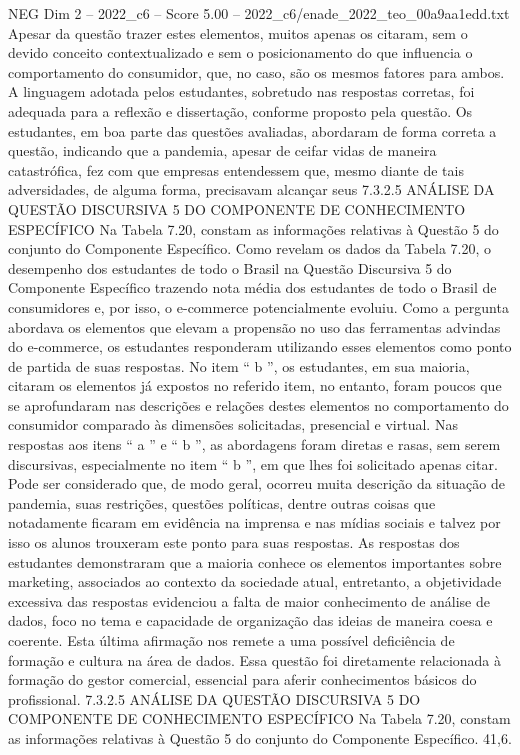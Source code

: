 \begin{textsample}{NEG Dim 2 – 2022\_c6 – Score 5.00 – 2022\_c6/enade\_2022\_teo\_00a9aa1edd.txt}
Apesar da questão trazer estes elementos, muitos apenas os citaram, sem o devido conceito contextualizado e sem o posicionamento do que influencia o comportamento do consumidor, que, no caso, são os mesmos fatores para ambos.
A linguagem adotada pelos estudantes, sobretudo nas respostas corretas, foi adequada para a reflexão e dissertação, conforme proposto pela questão.
Os estudantes, em boa parte das questões avaliadas, abordaram de forma correta a questão, indicando que a pandemia, apesar de ceifar vidas de maneira catastrófica, fez com que empresas entendessem que, mesmo diante de tais adversidades, de alguma forma, precisavam alcançar seus 7.3.2.5 ANÁLISE DA QUESTÃO DISCURSIVA 5 DO COMPONENTE DE CONHECIMENTO ESPECÍFICO Na Tabela 7.20, constam as informações relativas à Questão 5 do conjunto do Componente Específico.
Como revelam os dados da Tabela 7.20, o desempenho dos estudantes de todo o Brasil na Questão Discursiva 5 do Componente Específico trazendo nota média dos estudantes de todo o Brasil de consumidores e, por isso, o e-commerce potencialmente evoluiu.
Como a pergunta abordava os elementos que elevam a propensão no uso das ferramentas advindas do e-commerce, os estudantes responderam utilizando esses elementos como ponto de partida de suas respostas.
No item “ b ”, os estudantes, em sua maioria, citaram os elementos já expostos no referido item, no entanto, foram poucos que se aprofundaram nas descrições e relações destes elementos no comportamento do consumidor comparado às dimensões solicitadas, presencial e virtual.
Nas respostas aos itens “ a ” e “ b ”, as abordagens foram diretas e rasas, sem serem discursivas, especialmente no item “ b ”, em que lhes foi solicitado apenas citar.
Pode ser considerado que, de modo geral, ocorreu muita descrição da situação de pandemia, suas restrições, questões políticas, dentre outras coisas que notadamente ficaram em evidência na imprensa e nas mídias sociais e talvez por isso os alunos trouxeram este ponto para suas respostas.
As respostas dos estudantes demonstraram que a maioria conhece os elementos importantes sobre marketing, associados ao contexto da sociedade atual, entretanto, a objetividade excessiva das respostas evidenciou a falta de maior conhecimento de análise de dados, foco no tema e capacidade de organização das ideias de maneira coesa e coerente.
Esta última afirmação nos remete a uma possível deficiência de formação e cultura na área de dados.
Essa questão foi diretamente relacionada à formação do gestor comercial, essencial para aferir conhecimentos básicos do profissional. 7.3.2.5 ANÁLISE DA QUESTÃO DISCURSIVA 5 DO COMPONENTE DE CONHECIMENTO ESPECÍFICO Na Tabela 7.20, constam as informações relativas à Questão 5 do conjunto do Componente Específico. 41,6.

\end{textsample}
